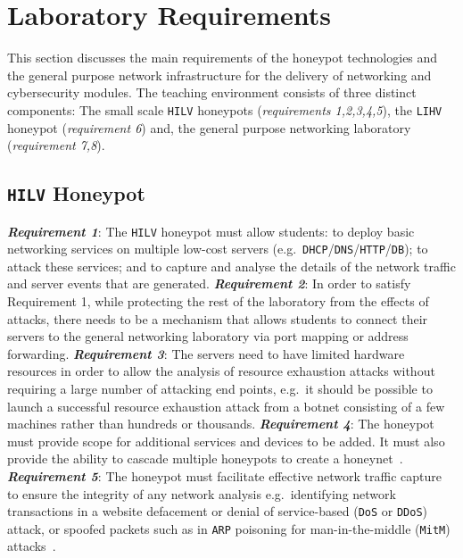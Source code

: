 \documentclass{ieeeaccess}
\begin{document}
\section{Laboratory Requirements}\label{sec:TeachingRequire}

This section discusses the main requirements of the honeypot technologies and the general purpose network infrastructure for the delivery of networking and cybersecurity modules. The teaching environment consists of three distinct components: The small scale \texttt{HILV} honeypots (\textit{requirements 1,2,3,4,5}), the \texttt{LIHV} honeypot (\textit{requirement 6}) and, the general purpose networking laboratory (\textit{requirement 7,8}).

\subsection{\texttt{HILV} Honeypot}\label{subsec:ResearchHoneypot}

\noindent\textit{\textbf{Requirement 1}}:
The \texttt{HILV} honeypot must allow students: to deploy basic networking services
on multiple low-cost servers
(e.g.\ \texttt{DHCP}/\texttt{DNS}/\texttt{HTTP}/\texttt{DB}); to attack these
services; and to capture and analyse the details of the network traffic
and server events that are generated.
\newline\newline
\noindent\textit{\textbf{Requirement 2}}:
In order to satisfy Requirement 1, while protecting the rest of the laboratory
from the effects of attacks, there needs to be a mechanism that allows students
to connect their servers to the general networking laboratory via port mapping
or address forwarding.
\newline\newline
\noindent\textit{\textbf{Requirement 3}}:
The servers need to have limited hardware resources in order to allow the
analysis of resource exhaustion attacks without requiring a large number of
attacking end points, e.g.\ it should be possible to launch a successful
resource exhaustion attack from a botnet consisting of a few machines rather
than hundreds or thousands.
\newline\newline
\noindent\textit{\textbf{Requirement 4}}:
The honeypot must provide scope for additional services and devices to be
added. It must also provide the ability to cascade multiple honeypots to create
a honeynet~\cite{AA:15,FDF:15,KNC:15}.
\newline\newline
\noindent\textit{\textbf{Requirement 5}}:
The honeypot must facilitate effective network traffic capture to ensure the
integrity of any network analysis e.g.\ identifying network transactions in a
website defacement or denial of service-based (\texttt{DoS} or \texttt{DDoS})
attack, or spoofed packets such as in \texttt{ARP} poisoning for
man-in-the-middle (\texttt{MitM}) attacks~\cite{PS:16,RSKA:16}.
\end{document}
